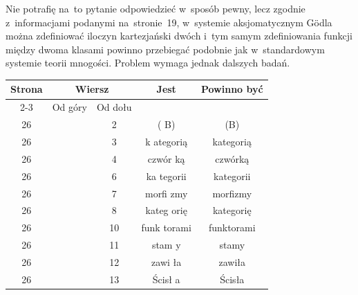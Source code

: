 \documentclass[a4paper,11pt]{article}
\numberwithin{equation}{section}
\begin{document}
Nie potrafię na~to pytanie odpowiedzieć w~sposób pewny, lecz zgodnie
z~informacjami podanymi na~stronie~19, w~systemie aksjomatycznym G\"{o}dla
można zdefiniować iloczyn kartezjański dwóch i~tym samym zdefiniowania
funkcji między dwoma klasami powinno przebiegać podobnie jak w~standardowym
systemie teorii mnogości. Problem wymaga jednak dalszych badań.




























\newpage



\begin{center}

  \begin{tabular}{|c|c|c|c|c|}
    \hline
    Strona & \multicolumn{2}{c|}{Wiersz} & Jest
                              & Powinno być \\ \cline{2-3}
    & Od góry & Od dołu & & \\
    \hline
    26  & & \hphantom{0}2 & ( B) & (B) \\
    26  & & \hphantom{0}3 & k ategorią & kategorią \\
    26  & & \hphantom{0}4 & czwór ką & czwórką \\
    26  & & \hphantom{0}6 & ka tegorii & kategorii \\
    26  & & \hphantom{0}7 & morfi zmy & morfizmy \\
    26  & & \hphantom{0}8 & kateg orię & kategorię \\
    26  & & 10 & funk torami & funktorami \\
    26  & & 11 & stam y & stamy \\
    26  & & 12 & zawi ła & zawiła \\
    26  & & 13 & Ścisł a & Ścisła \\
    \hline
  \end{tabular}

\end{center}
\end{document}
